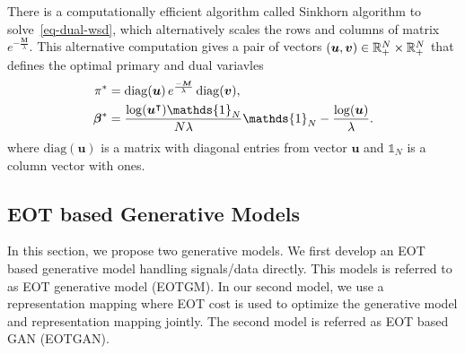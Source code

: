 There is a computationally efficient algorithm called Sinkhorn
algorithm\cite{2013arXiv1306.0895C, 2013arXiv1310.4375C} to
solve~\eqref{eq-dual-wsd}, which alternatively scales the rows and columns of matrix $e^{-\frac{\bm{M}}{\lambda}}$. This alternative computation gives a pair of vectors $(\bm{u}, \bm{v}) \in \mathbb{R}^N_{+} \times \mathbb{R}^N_{+}$ that defines the optimal primary and dual variavles \cite[Proposition~2]{2013arXiv1310.4375C} 
\begin{align}\label{eq-dual-opt}
  \pi^{\ast} &=
               \mathrm{diag}(\bm{u}) \, e^{\frac{-\bm{M}}{\la}} \, \mathrm{diag}(\bm{v}),  \nonumber \\
  \bm{\beta}^{\ast} &= \frac{\log(\bm{u}^{\intercal})\mathds{1}_N}{N\la} \mathds{1}_N -\frac{\log(\bm{u})}{\la}.
\end{align}
where $\mathrm{diag}(\bm{u})$ is a matrix with diagonal entries from vector $\bm{u}$ and $\mathds{1}_N$ is a column vector with ones.


\subsection{EOT based Generative Models}

In this section, we propose two generative models.
We first develop an EOT based generative model handling signals/data directly. This models is referred to as EOT generative model (EOTGM). 
In our second model, we use a
representation mapping where EOT cost is used to optimize the
generative model and representation mapping jointly. The second model is referred as EOT based GAN (EOTGAN).

